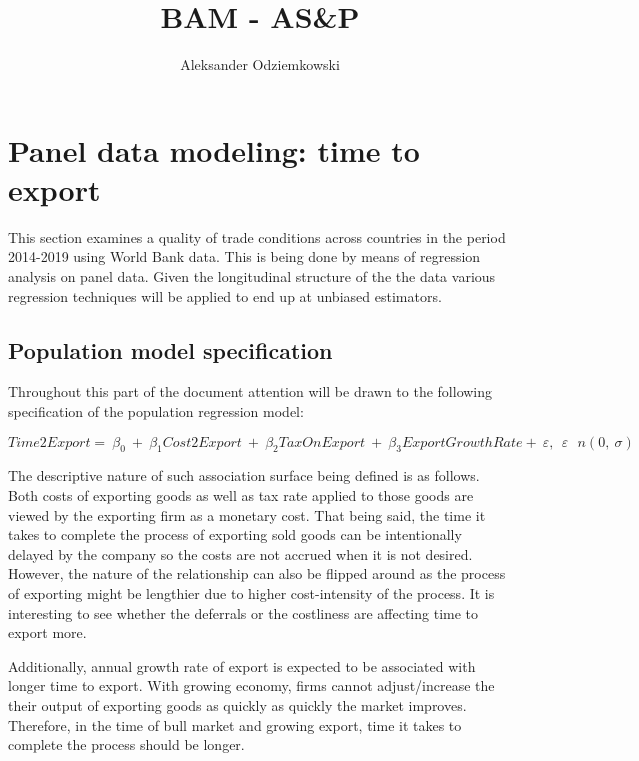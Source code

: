 \documentclass{article}
\title{BAM - AS\&P}
\author{Aleksander Odziemkowski}
\begin{document}
\maketitle

\begin{abstract}
\centering
\end{abstract}

\section{Panel data modeling: time to export}

This section examines a quality of trade conditions across countries in the period 2014-2019 using World Bank data. This is being done by means of regression analysis on panel data. Given the longitudinal structure of the the data various regression techniques will be applied to end up at unbiased estimators. 

\subsection{Population model specification}

Throughout this part of the document attention will be drawn to the following specification of the population regression model: 

$Time2Export=\ \beta_0\ +\ \beta_1Cost2Export\ +\ \beta_2TaxOnExport\ +\ \beta_3ExportGrowthRate+\ \varepsilon,\ \ \varepsilon\ ~\ n(0,\ \sigma)$

The descriptive nature of such association surface being defined is as follows. Both costs of exporting goods as well as tax rate applied to those goods are viewed by the exporting firm as a monetary cost. That being said, the time it takes to complete the process of exporting sold goods can be intentionally delayed by the company so the costs are not accrued when it is not desired. However, the nature of the relationship can also be flipped around as the process of exporting might be lengthier due to higher cost-intensity of the process. It is interesting to see whether the deferrals or the costliness are affecting time to export more. 

Additionally, annual growth rate of export is expected to be associated with longer time to export. With growing economy, firms cannot adjust/increase the their output of exporting goods as quickly as quickly the market improves. Therefore, in the time of bull market and growing export, time it takes to complete the process should be longer.
\end{document}
